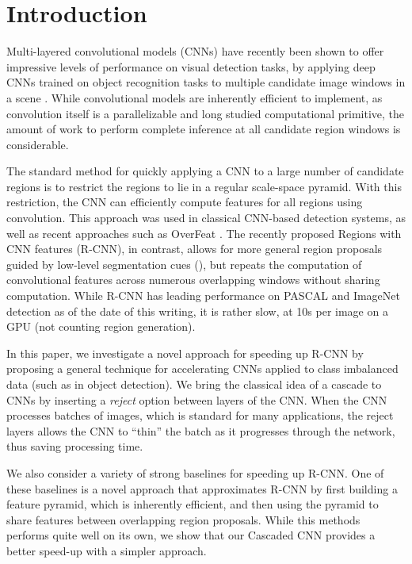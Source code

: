 \section{Introduction}\label{introduction}

Multi-layered convolutional models (CNNs) have recently been shown to offer impressive levels of performance on visual detection tasks, by applying deep CNNs trained on object recognition tasks to multiple candidate image windows in a scene \cite{Sermanet-ICLR-2014,Girshick-CVPR-2014}.
While convolutional models are inherently efficient to implement, as convolution itself is a parallelizable and long studied computational primitive, the amount of work to perform complete inference at all candidate region windows is considerable.

The standard method for quickly applying a CNN to a large number of candidate regions is to restrict the regions to lie in a regular scale-space pyramid.
With this restriction, the CNN can efficiently compute features for all regions using convolution.
This approach was used in classical CNN-based detection systems, as well as recent approaches such as OverFeat \cite{Sermanet-ICLR-2014}.
The recently proposed Regions with CNN features (R-CNN), in contrast, allows for more general region proposals guided by low-level segmentation cues (\cite{Uijlings-IJCV-2013}), but repeats the computation of convolutional features across numerous overlapping windows without sharing computation.
While R-CNN has leading performance on PASCAL and ImageNet detection as of the date of this writing, it is rather slow, at 10s per image on a GPU (not counting region generation).

In this paper, we investigate a novel approach for speeding up R-CNN by proposing a general technique for accelerating CNNs applied to class imbalanced data (such as in object detection).
We bring the classical idea of a cascade to CNNs by inserting a \emph{reject} option between layers of the CNN.
When the CNN processes batches of images, which is standard for many applications, the reject layers allows the CNN to ``thin'' the batch as it progresses through the network, thus saving processing time.

We also consider a variety of strong baselines for speeding up R-CNN.
One of these baselines is a novel approach that approximates R-CNN by first building a feature pyramid, which is inherently efficient, and then using the pyramid to share features between overlapping region proposals.
While this methods performs quite well on its own, we show that our Cascaded CNN provides a better speed-up with a simpler approach.

